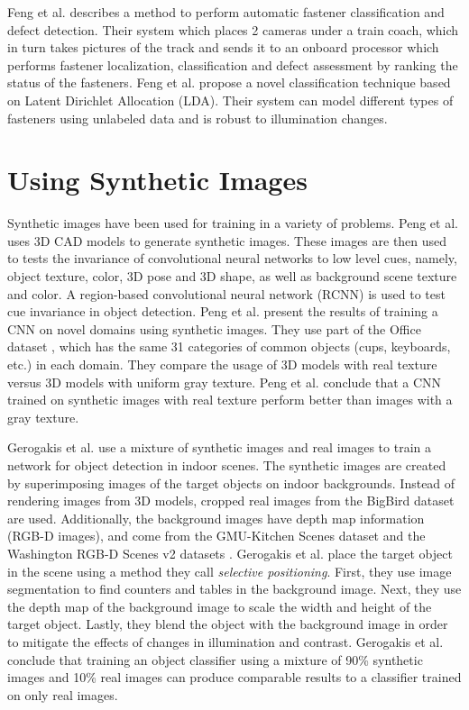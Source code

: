 Feng et al. \cite{feng2014automatic} describes a method to perform automatic fastener classification and defect detection. Their system which places 2 cameras under a train coach, which in turn takes pictures of the track and sends it to an onboard processor which performs fastener localization, classification and defect assessment by ranking the status of the fasteners. Feng et al. propose a novel classification technique based on Latent Dirichlet Allocation (LDA). Their system can model different types of fasteners using unlabeled data and is robust to illumination changes.


\section{Using Synthetic Images}\label{sec:synthetic_usage}

Synthetic images have been used for training in a variety of problems. Peng et al. \cite{peng2015learning} uses 3D CAD models to generate synthetic images. These images are then used to tests the invariance of convolutional neural networks to low level cues, namely, object texture, color, 3D pose and 3D shape, as well as background scene texture and color. A region-based convolutional neural network (RCNN) \cite{girshick2014rich} is used to test cue invariance in object detection. Peng et al. present the results of training a CNN on novel domains using synthetic images. They use part of the Office dataset \cite{saenko2010adapting}, which has the same 31 categories of common objects (cups, keyboards, etc.) in each domain. They compare the usage of 3D models with real texture versus 3D models with uniform gray texture. Peng et al. conclude that a CNN trained on synthetic images with real texture perform better than images with a gray texture.

Gerogakis et al. \cite{georgakis2017synthesizing} use a mixture of synthetic images and real images to train a network for object detection in indoor scenes. The synthetic images are created by superimposing images of the target objects on indoor backgrounds. Instead of rendering images from 3D models, cropped real images from the BigBird dataset \cite{singh2014bigbird} are used. Additionally, the background images have depth map information (RGB-D images), and come from the GMU-Kitchen Scenes dataset \cite{georgakis2016multiview} and the Washington RGB-D Scenes v2 datasets \cite{lai2014unsupervised}. Gerogakis et al. place the target object in the scene using a method they call \textit{selective positioning}. First, they use image segmentation to find counters and tables in the background image. Next, they use the depth map of the background image to scale the width and height of the target object. Lastly, they blend the object with the background image in order to mitigate the effects of changes in illumination and contrast. Gerogakis et al. conclude that training an object classifier using a mixture of 90\% synthetic images and 10\% real images can produce comparable results to a classifier trained on only real images.

